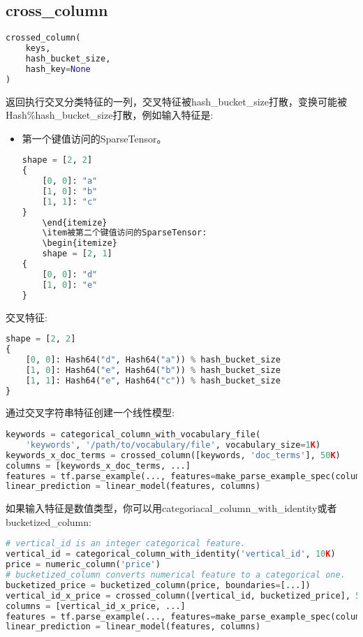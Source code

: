 \subsection{cross\_column}
\begin{lstlisting}[language=Python]
crossed_column(
    keys,
    hash_bucket_size,
    hash_key=None
)
\end{lstlisting}
返回执行交叉分类特征的一列，交叉特征被hash\_bucket\_size打散，变换可能被Hash\%hash\_bucket\_size打散，例如输入特征是:
\begin{itemize}
	\item 第一个键值访问的SparseTensor。
	\begin{lstlisting}[language=Python]
	shape = [2, 2]
{
    [0, 0]: "a"
    [1, 0]: "b"
    [1, 1]: "c"
}
	\end{itemize}
	\item被第二个键值访问的SparseTensor:
	\begin{itemize}
	shape = [2, 1]
{
    [0, 0]: "d"
    [1, 0]: "e"
}
	\end{lstlisting}
\end{itemize}
交叉特征:
\begin{lstlisting}[language=Python]
 shape = [2, 2]
{
    [0, 0]: Hash64("d", Hash64("a")) % hash_bucket_size
    [1, 0]: Hash64("e", Hash64("b")) % hash_bucket_size
    [1, 1]: Hash64("e", Hash64("c")) % hash_bucket_size
}
\end{lstlisting}
通过交叉字符串特征创建一个线性模型:
\begin{lstlisting}[language=Python]
keywords = categorical_column_with_vocabulary_file(
    'keywords', '/path/to/vocabulary/file', vocabulary_size=1K)
keywords_x_doc_terms = crossed_column([keywords, 'doc_terms'], 50K)
columns = [keywords_x_doc_terms, ...]
features = tf.parse_example(..., features=make_parse_example_spec(columns))
linear_prediction = linear_model(features, columns)
\end{lstlisting}
如果输入特征是数值类型，你可以用categoriacal\_column\_with\_identity或者bucketized\_column:
\begin{lstlisting}[language=Python]
# vertical_id is an integer categorical feature.
vertical_id = categorical_column_with_identity('vertical_id', 10K)
price = numeric_column('price')
# bucketized_column converts numerical feature to a categorical one.
bucketized_price = bucketized_column(price, boundaries=[...])
vertical_id_x_price = crossed_column([vertical_id, bucketized_price], 50K)
columns = [vertical_id_x_price, ...]
features = tf.parse_example(..., features=make_parse_example_spec(columns))
linear_prediction = linear_model(features, columns)
\end{lstlisting}
